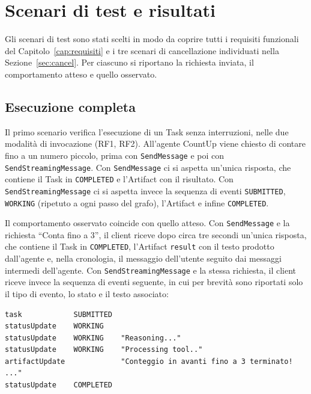 \section{Scenari di test e risultati}
\label{sec:scenari}

Gli scenari di test sono stati scelti in modo da coprire tutti i requisiti funzionali del Capitolo~\ref{cap:requisiti} e i tre scenari di cancellazione individuati nella Sezione~\ref{sec:cancel}. Per ciascuno si riportano la richiesta inviata, il comportamento atteso e quello osservato.

\subsection{Esecuzione completa}

Il primo scenario verifica l'esecuzione di un Task senza interruzioni, nelle due modalità di invocazione (RF1, RF2). All'agente CountUp viene chiesto di contare fino a un numero piccolo, prima con \texttt{SendMessage} e poi con \texttt{SendStreamingMessage}. Con \texttt{SendMessage} ci si aspetta un'unica risposta, che contiene il Task in \texttt{COMPLETED} e l'Artifact con il risultato. Con \texttt{SendStreamingMessage} ci si aspetta invece la sequenza di eventi \texttt{SUBMITTED}, \texttt{WORKING} (ripetuto a ogni passo del grafo), l'Artifact e infine \texttt{COMPLETED}.

Il comportamento osservato coincide con quello atteso. Con \texttt{SendMessage} e la richiesta ``Conta fino a 3'', il client riceve dopo circa tre secondi un'unica risposta, che contiene il Task in \texttt{COMPLETED}, l'Artifact \texttt{result} con il testo prodotto dall'agente e, nella cronologia, il messaggio dell'utente seguito dai messaggi intermedi dell'agente. Con \texttt{SendStreamingMessage} e la stessa richiesta, il client riceve invece la sequenza di eventi seguente, in cui per brevità sono riportati solo il tipo di evento, lo stato e il testo associato:

\begin{center}
\begin{minipage}{0.95\linewidth}
\footnotesize
\begin{verbatim}
task            SUBMITTED
statusUpdate    WORKING
statusUpdate    WORKING    "Reasoning..."
statusUpdate    WORKING    "Processing tool.."
artifactUpdate             "Conteggio in avanti fino a 3 terminato! ..."
statusUpdate    COMPLETED
\end{verbatim}
\end{minipage}
\end{center}

